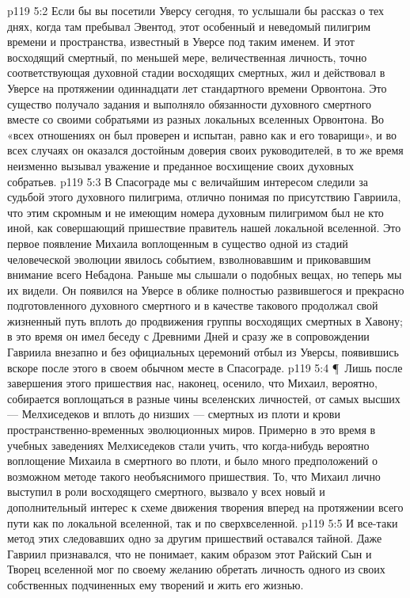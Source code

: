 \vs p119 5:2 Если бы вы посетили Уверсу сегодня, то услышали бы рассказ о тех днях, когда там пребывал Эвентод, этот особенный и неведомый пилигрим времени и пространства, известный в Уверсе под таким именем. И этот восходящий смертный, по меньшей мере, величественная личность, точно соответствующая духовной стадии восходящих смертных, жил и действовал в Уверсе на протяжении одиннадцати лет стандартного времени Орвонтона. Это существо получало задания и выполняло обязанности духовного смертного вместе со своими собратьями из разных локальных вселенных Орвонтона. Во «всех отношениях он был проверен и испытан, равно как и его товарищи», и во всех случаях он оказался достойным доверия своих руководителей, в то же время неизменно вызывал уважение и преданное восхищение своих духовных собратьев.
\vs p119 5:3 В Спасограде мы с величайшим интересом следили за судьбой этого духовного пилигрима, отлично понимая по присутствию Гавриила, что этим скромным и не имеющим номера духовным пилигримом был не кто иной, как совершающий пришествие правитель нашей локальной вселенной. Это первое появление Михаила воплощенным в существо одной из стадий человеческой эволюции явилось событием, взволновавшим и приковавшим внимание всего Небадона. Раньше мы слышали о подобных вещах, но теперь мы их видели. Он появился на Уверсе в облике полностью развившегося и прекрасно подготовленного духовного смертного и в качестве такового продолжал свой жизненный путь вплоть до продвижения группы восходящих смертных в Хавону; в это время он имел беседу с Древними Дней и сразу же в сопровождении Гавриила внезапно и без официальных церемоний отбыл из Уверсы, появившись вскоре после этого в своем обычном месте в Спасограде.
\vs p119 5:4 \P\ Лишь после завершения этого пришествия нас, наконец, осенило, что Михаил, вероятно, собирается воплощаться в разные чины вселенских личностей, от самых высших --- Мелхиседеков и вплоть до низших --- смертных из плоти и крови пространственно\hyp{}временных эволюционных миров. Примерно в это время в учебных заведениях Мелхиседеков стали учить, что когда\hyp{}нибудь вероятно воплощение Михаила в смертного во плоти, и было много предположений о возможном методе такого необъяснимого пришествия. То, что Михаил лично выступил в роли восходящего смертного, вызвало у всех новый и дополнительный интерес к схеме движения творения вперед на протяжении всего пути как по локальной вселенной, так и по сверхвселенной.
\vs p119 5:5 И все\hyp{}таки метод этих следовавших одно за другим пришествий оставался тайной. Даже Гавриил признавался, что не понимает, каким образом этот Райский Сын и Творец вселенной мог по своему желанию обретать личность одного из своих собственных подчиненных ему творений и жить его жизнью.
